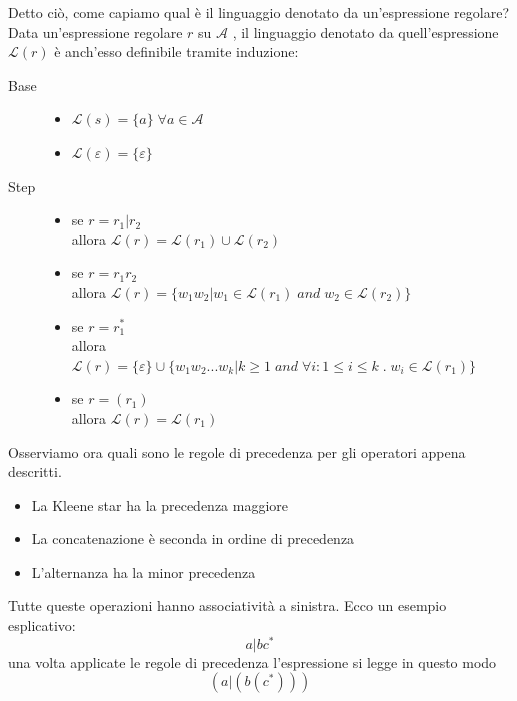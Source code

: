 \documentclass[class=book, crop=false, oneside, 12pt]{standalone}
\begin{document}
Detto ciò, come capiamo qual è il linguaggio denotato da un’espressione regolare?
Data un’espressione regolare \(r\) su \(\mathcal{A}\) , il linguaggio denotato da quell'espressione \(\mathcal{L}(r)\) è anch'esso definibile tramite induzione:
\begin{description}
    \item[Base] \begin{itemize}
                    \item \(\mathcal{L}(s) = \{a\} \; \forall a \in \mathcal{A}\)
                    \item \(\mathcal{L}(\varepsilon) = \{\varepsilon\}\)
                \end{itemize}
    \item[Step] \begin{itemize}
                    \item se \(r = r_1 | r_2 \) \\allora \(\mathcal{L}(r)= \mathcal{L}(r_1) \cup \mathcal{L}(r_2)\)
                    \item se \(r=r_1r_2\) \\allora \(\mathcal{L}(r) = \{w_1 w_2 | w_1 \in \mathcal{L}(r_1) \; and \; w_2 \in \mathcal{L}(r_2)\}\)
                    \item se \(r = r_1^*\) \\allora \( \mathcal{L}(r) = \{ \varepsilon \} \cup \{ w_1 w_2 ... w_k | k \ge 1 \; and \; \forall i : 1 \le i \le k \; . \; w_i \in \mathcal{L}(r_1)\} \)
                    \item se \(r=(r_1)\) \\allora \( \mathcal{L}(r) = \mathcal{L}(r_1)\)
                \end{itemize}
\end{description}

Osserviamo ora quali sono le regole di precedenza per gli operatori appena descritti.
\begin{itemize}
    \item La Kleene star ha la precedenza maggiore
    \item La concatenazione è seconda in ordine di precedenza
    \item L'alternanza ha la minor precedenza
\end{itemize}
Tutte queste operazioni hanno associatività a sinistra.
Ecco un esempio esplicativo:
\begin{equation*}
    a | b c^*
\end{equation*}
una volta applicate le regole di precedenza l'espressione si legge in questo modo
\begin{equation*}
    (a | ( b  ( c^* ) ) )
\end{equation*}    
\end{document}
